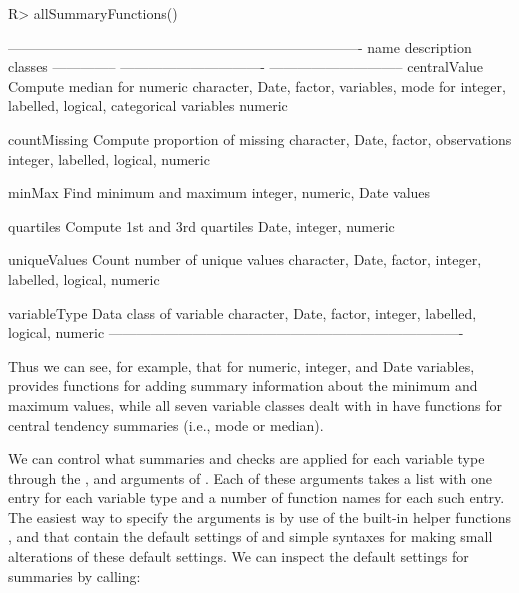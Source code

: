 \documentclass[article,shortnames]{jss}
\begin{document}
\begin{Schunk}
\begin{Sinput}
R> allSummaryFunctions()
\end{Sinput}
\begin{Soutput}
----------------------------------------------------------------------------
name           description                     classes                      
-------------- ------------------------------- -----------------------------
centralValue   Compute median for numeric      character, Date, factor,     
               variables, mode for             integer, labelled, logical,  
               categorical variables           numeric                      

countMissing   Compute proportion of missing   character, Date, factor,     
               observations                    integer, labelled, logical,  
                                               numeric                      

minMax         Find minimum and maximum        integer, numeric, Date       
               values                                                       

quartiles      Compute 1st and 3rd quartiles   Date, integer, numeric       

uniqueValues   Count number of unique values   character, Date, factor,     
                                               integer, labelled, logical,  
                                               numeric                      

variableType   Data class of variable          character, Date, factor,     
                                               integer, labelled, logical,  
                                               numeric                      
----------------------------------------------------------------------------
\end{Soutput}
\end{Schunk}

Thus we can see, for example, that for numeric, integer,
and Date variables,  provides functions for
adding summary information about the minimum and maximum values, while
all seven variable classes dealt with in  have functions
for central tendency summaries (i.e., mode or median).

We can control what summaries and checks are applied for each variable type
through the ,  and  arguments of . Each of these arguments takes a list with one entry for each variable type and a number of function names for each such entry. The easiest way to specify the arguments is by use of the built-in helper functions ,  and  that contain the default settings of  and simple syntaxes for making small alterations of these default settings.  We can inspect the default settings for summaries by calling:
\end{document}
